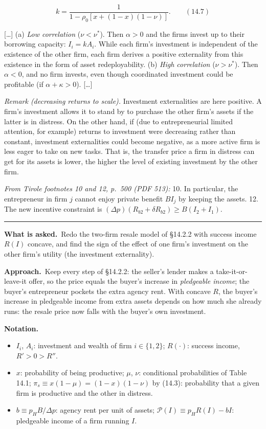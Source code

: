 \documentclass[11pt,a4paper]{article}
\newcommand{\notation}{\par\noindent\textbf{Notation.}}
\newcommand{\asked}{\par\medskip\noindent\textbf{What is asked.}~}
\newcommand{\approach}{\par\smallskip\noindent\textbf{Approach.}~}
\newcommand{\Pc}{\mathcal{P}}
\newcommand{\stmtend}{\par\endgroup\nopagebreak\noindent\rule{\linewidth}{0.4pt}\par\medskip}
\begin{document}
\[k = \frac{1}{1 - \rho_0[x + (1 - x)(1 - \nu)]}. \qquad (14.7)\]

{[}\ldots{]} (a) \emph{Low correlation} (\(\nu < \nu^*\)). Then \(\alpha > 0\) and the firms invest
up to their borrowing capacity: \(I_i = kA_i\). While each firm's investment is independent of the
existence of the other firm, each firm derives a positive externality from this existence in the
form of asset redeployability. (b) \emph{High correlation} (\(\nu > \nu^*\)). Then \(\alpha < 0\),
and no firm invests, even though coordinated investment could be profitable (if
\(\alpha + \kappa > 0\)). {[}\ldots{]}

\emph{Remark (decreasing returns to scale).} Investment externalities are here positive. A firm's
investment allows it to stand by to purchase the other firm's assets if the latter is in distress.
On the other hand, if (due to entrepreneurial limited attention, for example) returns to investment
were decreasing rather than constant, investment externalities could become negative, as a more
active firm is less eager to take on new tasks. That is, the transfer price a firm in distress can
get for its assets is lower, the higher the level of existing investment by the other firm.

\emph{From Tirole footnotes 10 and 12, p.~500 (PDF 513):} 10. In particular, the entrepreneur in
firm \(j\) cannot enjoy private benefit \(BI_j\) by keeping the assets. 12. The new incentive
constraint is \((\Delta p)(R_{b2} + \delta R_{b2}) \geqslant B(I_2 + I_1)\).
\stmtend

\asked Redo the two-firm resale model of \S14.2.2 with success income $R(I)$ concave, and find the sign of the effect of one firm's investment on the other firm's utility (the investment externality).

\approach Keep every step of \S14.2.2: the seller's lender makes a take-it-or-leave-it offer, so the price equals the buyer's increase in \emph{pledgeable income}; the buyer's entrepreneur pockets the extra agency rent. With concave $R$, the buyer's increase in pledgeable income from extra assets depends on how much she already runs: the resale price now falls with the buyer's own investment.

\notation
\begin{itemize}
  \item $I_i$, $A_i$: investment and wealth of firm $i\in\{1,2\}$; $R(\cdot)$: success income, $R'>0>R''$.
  \item $x$: probability of being productive; $\mu$, $\nu$: conditional probabilities of Table 14.1; $\pi_s\equiv x(1-\mu)=(1-x)(1-\nu)$ by (14.3): probability that a given firm is productive and the other in distress.
  \item $b\equiv p_HB/\Delta p$: agency rent per unit of assets; $\Pc(I)\equiv p_HR(I)-bI$: pledgeable income of a firm running $I$.
\end{itemize}
\end{document}

